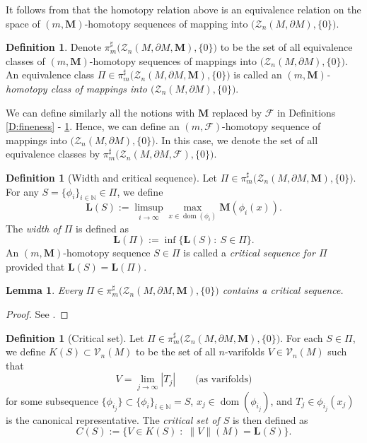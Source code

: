 \documentclass[10pt]{amsart}
\newtheorem{lemma}[theorem]{Lemma}
\theoremstyle{definition}
\newtheorem{definition}[theorem]{Definition}
\theoremstyle{remark}
\numberwithin{equation}{section}
\newcommand{\V}{\mathcal{V}}
\newcommand{\N}{\mathbb{N}}
\newcommand{\F}{\mathcal{F}}
\newcommand{\Z}{\mathcal{Z}}
\newcommand{\M}{\mathbf{M}}
\newcommand{\bL}{\mathbf{L}}
\newcommand{\dom}{\operatorname{dom}}
\begin{document}
It follows from \cite[\S 4.1.2]{Pitts} that the homotopy relation above is an equivalence relation on the space of $(m, \M)$-homotopy sequences of mapping into $\big(\Z_{n}(M, \partial M), \{0\}\big)$.

\begin{definition} 
\label{D:m-M-homotopy-class}
Denote $\pi^{\sharp}_{m}\big(\Z_n(M, \partial M, \M), \{0\}\big)$ to be the set of all equivalence classes of $(m, \M)$-homotopy sequences of mappings into $\big(\Z_n(M, \partial M), \{0\}\big)$. An equivalence class $\Pi \in \pi^{\sharp}_{m}\big(\Z_n(M, \partial M, \M), \{0\}\big)$ is called an \emph{$(m,\M)$-homotopy class of mappings into $\big(\Z_n(M, \partial M), \{0\}\big)$}.
\end{definition}

We can define similarly all the notions with $\M$ replaced by $\F$ in Definitions \ref{D:fineness} - \ref{D:m-M-homotopy-class}. Hence, we can define an $(m, \F)$-homotopy sequence of mappings into $\big(\Z_n(M, \partial M), \{0\}\big)$. In this case, we denote the set of all equivalence classes by $\pi^{\sharp}_m\big(\Z_n(M, \partial M, \F), \{0\}\big)$.


\begin{definition}[Width and critical sequence]
Let $\Pi\in\pi^{\sharp}_{m}\big(\Z_n(M, \partial M, \M), \{0\}\big)$. For any $S=\{\phi_i\}_{i \in \N} \in \Pi$, we define 
\[ \bL(S):=\limsup_{i\rightarrow\infty} \max_{x \in \dom(\phi_i)} \M(\phi_{i}(x)).\]
The \emph{width of $\Pi$} is defined as
\begin{equation}
\label{E:width}
\bL(\Pi):=\inf\{\bL(S):\ S\in\Pi\}.
\end{equation}
An $(m,\M)$-homotopy sequence $S\in\Pi$ is called a \emph{critical sequence for $\Pi$} provided that $\bL(S)=\bL(\Pi)$.
\end{definition}

\begin{lemma}
Every $\Pi\in\pi^{\sharp}_{m}\big(\Z_n(M, \partial M, \M), \{0\}\big)$ contains a critical sequence.
\end{lemma}
\begin{proof}
See \cite[4.1(4)]{Pitts}.
\end{proof}

\begin{definition}[Critical set]
Let $\Pi\in\pi^{\sharp}_{m}\big(\Z_n(M, \partial M, \M), \{0\}\big)$. For each $S \in \Pi$, we define $K(S) \subset \V_n(M)$ to be the set of all $n$-varifolds $V \in \V_n(M)$ such that
\[ V=\lim_{j \to \infty} |T_j| \qquad \text{(as varifolds)} \]
for some subsequence $\{\phi_{i_j}\} \subset \{\phi_i\}_{i \in \N}=S$, $x_j \in \dom (\phi_{i_j})$, and $T_j \in \phi_{i_j}(x_j)$ is the canonical representative.
The \emph{critical set of $S$} is then defined as
\[ C(S):=\{V \in K(S) \; : \; \|V\|(M)=\bL(S)\}.\]
\end{definition}
\end{document}
